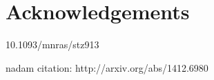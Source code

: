 \documentclass[a4paper,10pt]{report}
\begin{document}
\chapter*{Acknowledgements}




\nocite{book_planet_form}



10.1093/mnras/stz913

nadam citation: http://arxiv.org/abs/1412.6980
\end{document}
